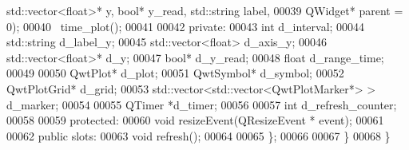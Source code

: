 \begin{DoxyCode}
      std::vector<float>* y, \textcolor{keywordtype}{bool}* y\_read, std::string label,
00039             QWidget* parent = 0);
00040             ~time_plot();
00041             
00042         \textcolor{keyword}{private}:
00043             \textcolor{keywordtype}{int} d_interval;
00044             std::string d_label_y;
00045             std::vector<float> d_axis_y;
00046             std::vector<float>* d_y;
00047             \textcolor{keywordtype}{bool}* d_y_read;
00048             \textcolor{keywordtype}{float} d_range_time;
00049             
00050             QwtPlot* d_plot;
00051             QwtSymbol* d_symbol;
00052             QwtPlotGrid* d_grid;
00053             std::vector<std::vector<QwtPlotMarker*> > d_marker;
00054             
00055             QTimer *d_timer;
00056             
00057             \textcolor{keywordtype}{int} d_refresh_counter;
00058             
00059         \textcolor{keyword}{protected}:
00060             \textcolor{keywordtype}{void} resizeEvent(QResizeEvent * event);
00061             
00062         \textcolor{keyword}{public} slots:
00063             \textcolor{keywordtype}{void} refresh();
00064             
00065         \};
00066 
00067     \}
00068 \}
\end{DoxyCode}
